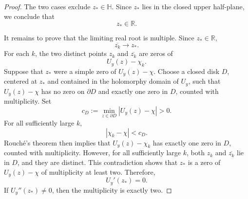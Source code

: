\documentclass[10pt,a4paper]{amsart}
\begin{document}
\begin{proof}
The two cases exclude \(z_*\in\mathbb H\). Since \(z_*\) lies in the closed
upper half-plane, we conclude that
\[
    z_*\in\mathbb R.
\]

It remains to prove that the limiting real root is multiple. Since
\(z_*\in\mathbb R\),
\[
    \overline{z_k}\longrightarrow z_*.
\]
For each \(k\), the two distinct points \(z_k\) and \(\overline{z_k}\) are
zeros of
\[
    U_y(z)-\chi_k.
\]
Suppose that \(z_*\) were a simple zero of \(U_y(z)-\chi\). Choose a closed
disk \(D\), centered at \(z_*\) and contained in the holomorphy domain of
\(U_y\), such that \(U_y(z)-\chi\) has no zero on \(\partial D\) and exactly
one zero in \(D\), counted with multiplicity. Set
\[
    c_D:=\min_{z\in\partial D}|U_y(z)-\chi|>0.
\]
For all sufficiently large \(k\),
\[
    |\chi_k-\chi|<c_D.
\]
Rouch\'e's theorem then implies that \(U_y(z)-\chi_k\) has exactly one zero
in \(D\), counted with multiplicity. However, for all sufficiently large
\(k\), both \(z_k\) and \(\overline{z_k}\) lie in \(D\), and they are
distinct. This contradiction shows that \(z_*\) is a zero of
\(U_y(z)-\chi\) of multiplicity at least two. Therefore,
\[
    U_y'(z_*)=0.
\]
If \(U_y''(z_*)\neq0\), then the multiplicity is exactly two.
\end{proof}
\end{document}

